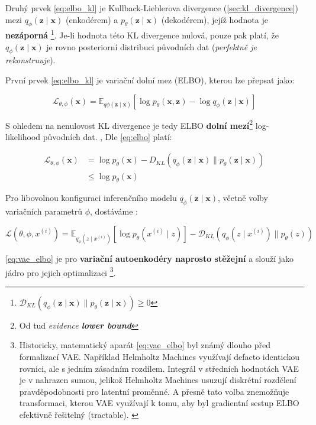 Druhý prvek \autoref{eq:elbo_kl} je Kullback-Lieblerova divergence (\autoref{sec:kl_divergence}) mezi $q_\phi(\textbf{z}\mid\textbf{x})$ (enkodérem) a $p_\theta(\textbf{z}\mid\textbf{x})$ (dekodérem), jejíž hodnota je \textbf{nezáporná}
\footnote{$\mathcal{D}_{KL}(q_\phi(\textbf{z}\mid\textbf{x})\parallel p_\theta(\textbf{z}\mid\textbf{x})) \geq 0$}.
Je-li hodnota této KL divergence nulová, pouze pak platí, že $q_\phi(\textbf{z}\mid\textbf{x})$ je rovno posteriorní distribuci původních dat (\emph{perfektně je rekonstruuje}). \cite{Kingma2019}


První prvek \autoref{eq:elbo_kl} je variační dolní mez (ELBO), kterou lze přepsat jako:

\begin{equation} \label{eq:elbo}
    \mathcal{L}_{\theta,\phi}(\textbf{x}) = \mathds{E}_{q\phi(\textbf{z}\mid\textbf{x})}[\log p_\theta(\textbf{x},\textbf{z}) - \log q_\phi(\textbf{z}\mid\textbf{x})]
\end{equation}

S ohledem na nenulovost KL divergence je tedy ELBO \textbf{dolní mezí}\footnote{Od tud \emph{evidence \textbf{lower bound}}} log-likelihood původních dat. \cite{Kingma2014}, \cite{Goodfellow2016}
Dle \autoref{eq:elbo} platí:

\begin{align}
    \mathcal{L}_{\theta,\phi}(\textbf{x}) &= \log p_\theta(\textbf{x}) - D_{KL}(q_\phi(\textbf{z}\mid\textbf{x})\parallel p_\theta(\textbf{z}\mid\textbf{x})) \\ \label{eq:vae_optimization_objective}
                                          &\leq \log p_\theta(\textbf{x})
\end{align}

Pro libovolnou konfiguraci inferenčního modelu $q_\phi(\textbf{z}\mid\textbf{x})$, včetně volby variačních parametrů $\phi$, dostáváme \cite[Rovnice 3]{Kingma2014}:

\begin{equation}
    \label{eq:vae_elbo}
    \mathcal{L}(\theta,\phi,x^{(i)}) = \mathds{E}_{q_\phi(z\mid x^{(i)})} \left[ \log p_\theta(x^{(i)}\mid z) \right] - \mathcal{D}_{KL}(q_\phi(z\mid x^{(i)})\parallel p_\theta(z))
\end{equation}

\autoref{eq:vae_elbo} je pro \textbf{variační autoenkodéry naprosto stěžejní} a slouží jako jádro pro jejich optimalizaci
\footnote{Historicky, matematický aparát \autoref{eq:vae_elbo} byl známý dlouho před formalizací VAE. Například Helmholtz Machines \cite{Dayan1995} využívají defacto identickou rovnici, ale s jedním zásadním rozdílem. Integrál v středních hodnotách VAE je v \cite[Rovnice 5]{Dayan1995} nahrazen sumou, jelikož Helmholtz Machines usuzují diskrétní rozdělení pravděpodobnosti pro latentní proměnné. A přesně tato volba znemožňuje transformaci, kterou VAE využívají k tomu, aby byl gradientní sestup ELBO efektivně řešitelný (tractable). \cite{Doersch2021}}. \cite{Doersch2021}

